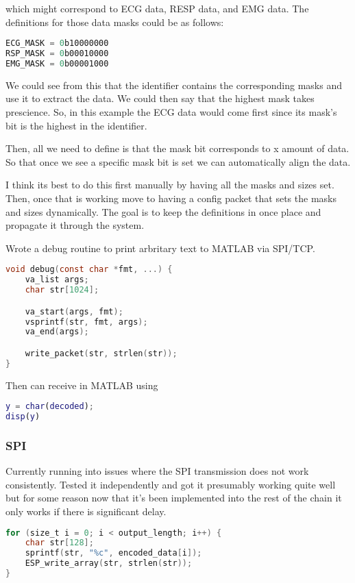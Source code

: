 which might correspond to ECG data, RESP data, and EMG data.
The definitions for those data masks could be as follows:

\begin{lstlisting}[language=C]
ECG_MASK = 0b10000000
RSP_MASK = 0b00010000
EMG_MASK = 0b00001000
\end{lstlisting}

We could see from this that the identifier contains the corresponding
masks and use it to extract the data.
We could then say that the highest mask takes prescience.
So, in this example the ECG data would come first since its mask's bit
is the highest in the identifier.

Then, all we need to define is that the mask bit corresponds to x amount
of data. So that once we see a specific mask bit is set we can
automatically align the data.

I think its best to do this first manually by having all the masks
and sizes set. Then, once that is working move to having a config packet
that sets the masks and sizes dynamically.
The goal is to keep the definitions in once place and propagate it
through the system.

Wrote a debug routine to print arbritary text to MATLAB via SPI/TCP.

\begin{lstlisting}[language=C]
void debug(const char *fmt, ...) {
    va_list args;
    char str[1024];

    va_start(args, fmt);
    vsprintf(str, fmt, args);
    va_end(args);

    write_packet(str, strlen(str));
}
\end{lstlisting}

Then can receive in MATLAB using

\begin{lstlisting}[language=MATLAB]
y = char(decoded);
disp(y)
\end{lstlisting}

\subsubsection{SPI}
Currently running into issues where the SPI transmission does not work consistently.
Tested it independently and got it presumably working quite well but for some reason
now that it's been implemented into the rest of the chain it only works if there is
significant delay.

\begin{lstlisting}[language=C]
for (size_t i = 0; i < output_length; i++) {
    char str[128];
    sprintf(str, "%c", encoded_data[i]);
    ESP_write_array(str, strlen(str));
}
\end{lstlisting}

